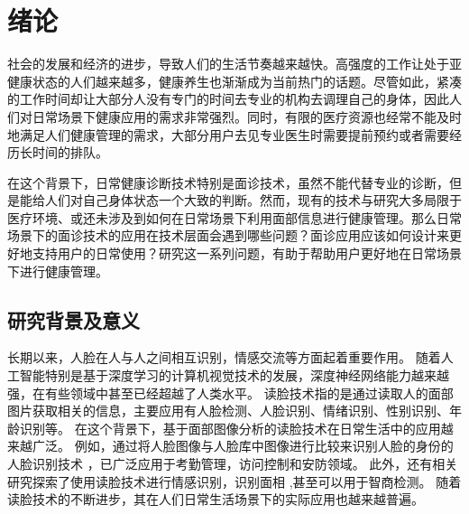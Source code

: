 \chapter{绪论}

社会的发展和经济的进步，导致人们的生活节奏越来越快。高强度的工作让处于亚健康状态的人们越来越多，健康养生也渐渐成为当前热门的话题。尽管如此，紧凑的工作时间却让大部分人没有专门的时间去专业的机构去调理自己的身体，因此人们对日常场景下健康应用的需求非常强烈。同时，有限的医疗资源也经常不能及时地满足人们健康管理的需求，大部分用户去见专业医生时需要提前预约或者需要经历长时间的排队。

在这个背景下，日常健康诊断技术特别是面诊技术，虽然不能代替专业的诊断，但是能给人们对自己身体状态一个大致的判断。然而，现有的技术与研究大多局限于医疗环境、或还未涉及到如何在日常场景下利用面部信息进行健康管理。那么日常场景下的面诊技术的应用在技术层面会遇到哪些问题？面诊应用应该如何设计来更好地支持用户的日常使用？研究这一系列问题，有助于帮助用户更好地在日常场景下进行健康管理。



\section{研究背景及意义}

长期以来，人脸在人与人之间相互识别，情感交流等方面起着重要作用。
随着人工智能特别是基于深度学习的计算机视觉技术的发展，深度神经网络能力越来越强，在有些领域中甚至已经超越了人类水平\cite{he2015delving}。
读脸技术指的是通过读取人的面部图片获取相关的信息，主要应用有人脸检测、人脸识别、情绪识别、性别识别、年龄识别等。
在这个背景下，基于面部图像分析的读脸技术在日常生活中的应用越来越广泛。
例如，通过将人脸图像与人脸库中图像进行比较来识别人脸的身份的人脸识别技术 \cite{Zhang2016Joint, Schroff2015FaceNet}，已广泛应用于考勤管理\cite{surekha2017attendance}，访问控制\cite{atick2000continuous}和安防领域\cite{liu2005ibotguard}。
此外，还有相关研究探索了使用读脸技术进行情感识别\cite{corneanu2016survey}，识别面相 \cite{Li2007Online, Tempark2012Chinese},甚至可以用于智商检测\cite{Kleisner2014Perceived}。
随着读脸技术的不断进步，其在人们日常生活场景下的实际应用也越来越普遍。

